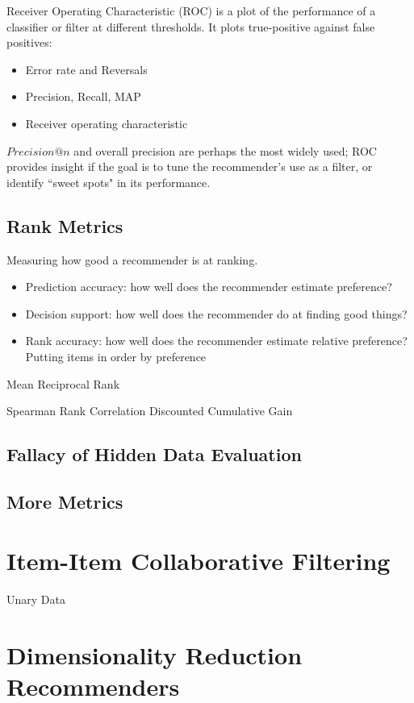 \documentclass[fleqn,twoside]{article}
\begin{document}
   Receiver Operating Characteristic (ROC) is a plot of the performance of a classifier or filter at different thresholds. It plots true-positive against false positives:
   
   
\begin{itemize}
\item   Error rate and Reversals
\item Precision, Recall, MAP
\item Receiver operating characteristic
\end{itemize}

 $Precision@n $ and overall precision are perhaps the most widely used; ROC provides insight if the goal is to tune the recommender's use as a filter, or identify ``sweet spots" in its performance.

\subsection{Rank Metrics}
Measuring how good a recommender is at ranking.

\begin{itemize}
\item Prediction accuracy: how well does the recommender estimate preference?
\item Decision support: how well does the recommender do at finding good things?
\item Rank accuracy: how well does the recommender estimate relative preference? \\
	Putting items in order by preference
\end{itemize}

Mean Reciprocal Rank

Spearman Rank Correlation
Discounted Cumulative Gain

\subsection{Fallacy of Hidden Data Evaluation}
\subsection{More Metrics}

\section{Item-Item Collaborative Filtering}

Unary Data

\section{Dimensionality Reduction Recommenders}
\end{document}
